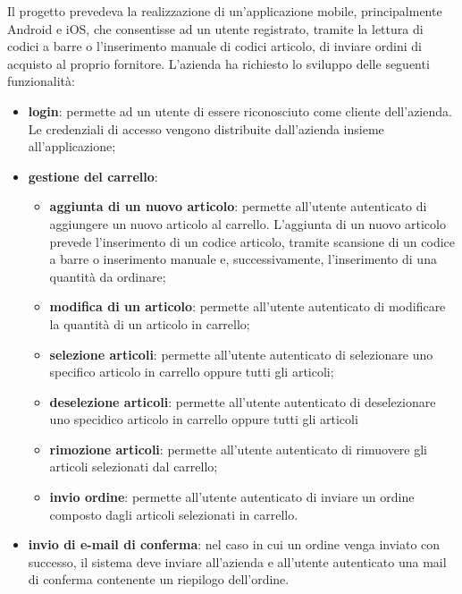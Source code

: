 Il progetto prevedeva la realizzazione di un'applicazione mobile, principalmente Android e iOS, che consentisse ad un utente registrato, tramite la lettura di codici a barre o l'inserimento manuale di codici articolo, di inviare ordini di acquisto al proprio fornitore. L'azienda ha richiesto lo sviluppo delle seguenti funzionalità:
\begin{itemize}
	\item \textbf{login}: permette ad un utente di essere riconosciuto come cliente dell'azienda. Le credenziali di accesso vengono distribuite dall'azienda insieme all'applicazione;
	\item \textbf{gestione del carrello}:
	\begin{itemize}
		\item \textbf{aggiunta di un nuovo articolo}: permette all'utente autenticato di aggiungere un nuovo articolo al carrello. L'aggiunta di un nuovo articolo prevede l'inserimento di un codice articolo, tramite scansione di un codice a barre o inserimento manuale e, successivamente, l'inserimento di una quantità da ordinare;
		\item \textbf{modifica di un articolo}: permette all'utente autenticato di modificare la quantità di un articolo in carrello;
		\item \textbf{selezione articoli}: permette all'utente autenticato di selezionare uno specifico articolo in carrello oppure tutti gli articoli;
		\item \textbf{deselezione articoli}: permette all'utente autenticato di deselezionare uno specidico articolo in carrello oppure tutti gli articoli
		\item \textbf{rimozione articoli}: permette all'utente autenticato di rimuovere gli articoli selezionati dal carrello;
		\item \textbf{invio ordine}: permette all'utente autenticato di inviare un ordine composto dagli articoli selezionati in carrello.
	\end{itemize}
	\item \textbf{invio di e-mail di conferma}: nel caso in cui un ordine venga inviato con successo, il sistema deve inviare all'azienda e all'utente autenticato una mail di conferma contenente un riepilogo dell'ordine.
\end{itemize}

